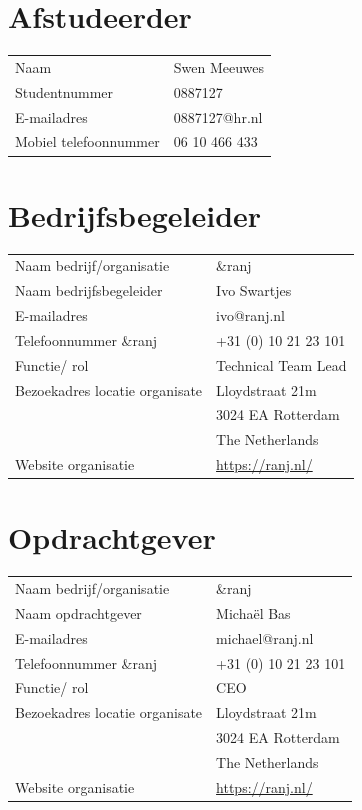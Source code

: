 \documentclass{report}
\makeatletter
\newcommand{\name}{Swen Meeuwes}
\newcommand{\studentnumber}{0887127}
\newcommand{\email}{0887127@hr.nl}
\newcommand{\mobilephone}{06 10 466 433}
\newcommand{\organisation}{\&ranj}
\makeatother
\begin{document}
\section*{Afstudeerder}
\begin{table}[h]
\begin{tabular}{ll}
Naam & \name \\
Studentnummer & \studentnumber \\
E-mailadres & \email \\
Mobiel telefoonnummer & \mobilephone
\end{tabular}
\end{table}

\section*{Bedrijfsbegeleider}
\begin{table}[h]
\begin{tabular}{ll}
Naam bedrijf/organisatie & \organisation \\
Naam bedrijfsbegeleider & Ivo Swartjes \\
E-mailadres & ivo@ranj.nl \\
Telefoonnummer \organisation & +31 (0) 10 21 23 101 \\
Functie/ rol & Technical Team Lead \\
Bezoekadres locatie organisate & Lloydstraat 21m \\ 
 & 3024 EA Rotterdam \\
 & The Netherlands \\
Website organisatie & \url{https://ranj.nl/}
\end{tabular}
\end{table}

\newpage

\section*{Opdrachtgever}
\begin{table}[h]
\begin{tabular}{ll}
Naam bedrijf/organisatie & \organisation \\
Naam opdrachtgever & Micha{\"e}l Bas \\
E-mailadres & michael@ranj.nl \\
Telefoonnummer \organisation & +31 (0) 10 21 23 101 \\
Functie/ rol & CEO \\
Bezoekadres locatie organisate & Lloydstraat 21m \\ 
 & 3024 EA Rotterdam \\
 & The Netherlands \\
Website organisatie & \url{https://ranj.nl/}
\end{tabular}
\end{table}
\end{document}
